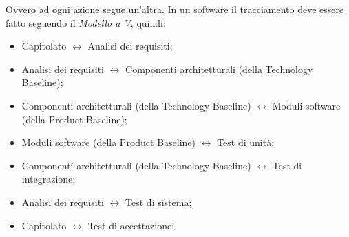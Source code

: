 \documentclass[../main]{subfiles}
\begin{document}
Ovvero ad ogni azione segue un'altra.
In un  software il tracciamento deve essere fatto seguendo il \textit{Modello a V}, quindi:
\begin{itemize}
    \item Capitolato $\leftrightarrow$ Analisi dei requisiti;
    \item Analisi dei requisiti $\leftrightarrow$ Componenti architetturali (della Technology Baseline);
    \item Componenti architetturali (della Technology Baseline) $\leftrightarrow$ Moduli software (della Product Baseline);
    \item Moduli software (della Product Baseline) $\leftrightarrow$ Test di unità;
    \item Componenti architetturali (della Technology Baseline) $\leftrightarrow$ Test di integrazione;
    \item Analisi dei requisiti $\leftrightarrow$ Test di sistema;
    \item Capitolato $\leftrightarrow$ Test di accettazione;
\end{itemize}
\end{document}
